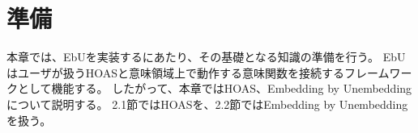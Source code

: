 \documentclass[uplatex]{sumiilab-paper}
\theoremstyle{mystyle}
\numberwithin{definition}{chapter} %
\begin{document}

\chapter{準備}
本章では、EbUを実装するにあたり、その基礎となる知識の準備を行う。
EbUはユーザが扱うHOASと意味領域上で動作する意味関数を接続するフレームワークとして機能する。
したがって、本章ではHOAS、Embedding by Unembeddingについて説明する。
2.1節ではHOASを、2.2節ではEmbedding by Unembeddingを扱う。

　
\end{document}

